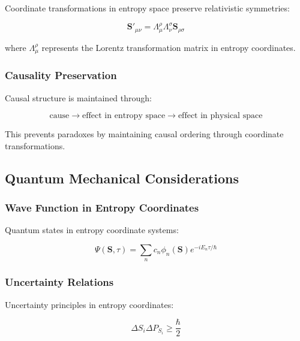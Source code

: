 \documentclass[12pt,a4paper]{article}
\begin{document}
Coordinate transformations in entropy space preserve relativistic symmetries:

\begin{equation}
\mathbf{S}'_{\mu\nu} = \Lambda^{\rho}_{\mu} \Lambda^{\sigma}_{\nu} \mathbf{S}_{\rho\sigma}
\label{eq:lorentz_invariant}
\end{equation}

where $\Lambda^{\rho}_{\mu}$ represents the Lorentz transformation matrix in entropy coordinates.

\subsubsection{Causality Preservation}

Causal structure is maintained through:

\begin{equation}
\text{cause} \rightarrow \text{effect in entropy space} \rightarrow \text{effect in physical space}
\label{eq:causality}
\end{equation}

This prevents paradoxes by maintaining causal ordering through coordinate transformations.

\subsection{Quantum Mechanical Considerations}

\subsubsection{Wave Function in Entropy Coordinates}

Quantum states in entropy coordinate systems:

\begin{equation}
\Psi(\mathbf{S}, \tau) = \sum_n c_n \phi_n(\mathbf{S}) e^{-iE_n\tau/\hbar}
\label{eq:quantum_entropy}
\end{equation}

\subsubsection{Uncertainty Relations}

Uncertainty principles in entropy coordinates:

\begin{equation}
\Delta S_i \Delta P_{S_i} \geq \frac{\hbar}{2}
\label{eq:uncertainty_entropy}
\end{equation}
\end{document}
